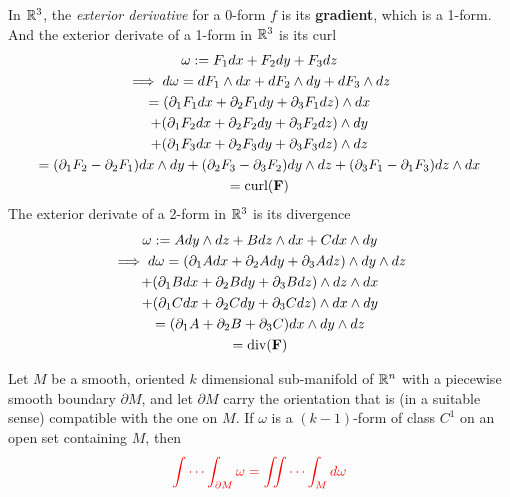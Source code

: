 \documentclass[11pt]{article}
\begin{document}
			\begin{example}
				In $\mathbb{R}^3$, the \emph{exterior derivative} for a 0-form $f$ is its \textbf{gradient}, which is a 1-form. \\
				And the exterior derivate of a 1-form in $\mathbb{R}^3$ is its curl 
				\begin{gather}
					\omega := F_1 dx + F_2 dy + F_3 dz \\
					\implies d\omega = dF_1 \land dx + dF_2 \land dy + dF_3 \land dz \\
					= (\partial_1 F_1 dx + \partial_2 F_1 dy + \partial_3 F_1 dz) \land dx \\
					+ (\partial_1 F_2 dx + \partial_2 F_2 dy + \partial_3 F_2 dz) \land dy \\
					+ (\partial_1 F_3 dx + \partial_2 F_3 dy + \partial_3 F_3 dz) \land dz \\
					= (\partial_1 F_2 - \partial_2 F_1) dx \land dy 
					+ (\partial_2 F_3 - \partial_3 F_2) dy \land dz
					+ (\partial_3 F_1 - \partial_1 F_3) dz \land dx \\
					= \text{curl}(\textbf{F})
				\end{gather}
				The exterior derivate of a 2-form in $\mathbb{R}^3$ is its divergence
				\begin{gather}
					\omega := A dy \land dz + B dz \land dx + C dx \land dy\\
					\implies d \omega = (\partial_1 A dx + \partial_2 A dy + \partial_3 A dz) \land dy \land dz \\
					+ (\partial_1 B dx + \partial_2 B dy + \partial_3 B dz) \land dz \land dx \\
					+ (\partial_1 C dx + \partial_2 C dy + \partial_3 C dz) \land dx \land dy \\
					= (\partial_1 A + \partial_2 B + \partial_3 C) dx \land dy \land dz \\
					= \text{div}(\textbf{F})
				\end{gather}
			\end{example}
			
			\begin{theorem}
				Let $M$ be a smooth, oriented $k$ dimensional sub-manifold of $\mathbb{R}^n$ with a piecewise smooth boundary $\partial M$, and let $\partial M$ carry the orientation that is (in a suitable sense) compatible with the one on $M$. If $\omega$ is a $(k-1)$-form of class $C^1$ on an open set containing $M$, then
				\begin{equation}
					\textcolor{red}{\idotsint_{\partial M} \omega = \iint \cdots \int_M d\omega}
				\end{equation}
			\end{theorem}
			
\end{document}
